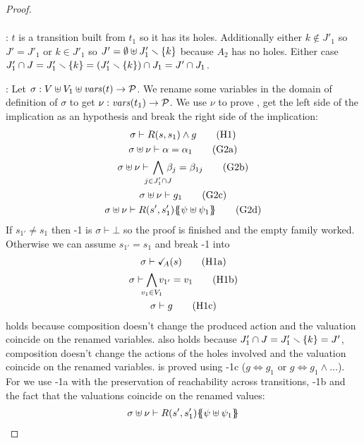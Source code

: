 \documentclass{article}
\begin{document}
\begin{proof}
\begin{gather}
	\end{gather}
\item[\goal{0'}:] \(t\) is a transition built from \(t_1\) so it has its holes.
	Additionally either \(k \notin J'_1\) so \(J' = J'_1\) or \(k \in J'_1\) so \(J' = \emptyset \uplus J'_1 \smallsetminus {\left\{k\right\}}\) because \(A_2\) has no holes.
	Either case \(J'_1 \cap J = J'_1 \smallsetminus {\left\{k\right\}} = {\left(J'_1 \smallsetminus {\left\{k\right\}}\right)} \cap J_1 = J' \cap J_1\).
\item[\goal{2}:] Let \(\sigma: V \uplus V_1 \uplus \mathit{vars}{\left(t\right)} \to \mathcal{P}\).
	We rename some variables in the domain of definition of \(\sigma\) to get \(\nu: \mathit{vars}{\left(t_1\right)} \to \mathcal{P}\).
	We use \(\nu\) to prove , get the left side of the implication as an hypothesis and break the right side of the implication:
	\begin{gather}
		\sigma \vdash R\mpar{s, s_1} \wedge g \hyp{1} \\
		\sigma \uplus \nu \vdash \alpha = \alpha_1 \goal{2a} \\
		\sigma \uplus \nu \vdash \bigwedge_\subbox{j \in J'_1 \cap J} \beta_j = \beta_{1j} \goal{2b} \\
		\sigma \uplus \nu \vdash g_1 \goal{2c} \\
		\sigma \uplus \nu \vdash R\mpar{s', s'_1}\psubst{\psi \uplus \psi_1} \goal{2d}
	\end{gather}
	If \(s_{1'} \neq s_1\) then \hyp{1} is \(\sigma \vdash \bot\) so the proof is finished and the empty family worked.
	Otherwise we can assume \(s_{1'} = s_1\) and break \hyp{1} into
	\begin{gather}
		\sigma \vdash \reach{A}\mpar{s} \hyp{1a} \\
		\sigma \vdash \bigwedge_\subbox{v_1 \in V_1} v_{1'} = v_1 \hyp{1b} \\
		\sigma \vdash g \hyp{1c}
	\end{gather}
	 holds because composition doesn't change the produced action and the valuation coincide on the renamed variables.
	 also holds because \(J'_1 \cap J = J'_1 \smallsetminus {\left\{k\right\}} = J'\), composition doesn't change the actions of the holes involved and the valuation coincide on the renamed variables.
	 is proved using \hyp{1c} (\(g \iff g_1\) or \(g \iff g_1 \wedge \dots\)).
	For  we use \hyp{1a} with the preservation of reachability across transitions, \hyp{1b} and the fact that the valuations coincide on the renamed values:
	\begin{align*}
		& \sigma \uplus \nu \vdash R\mpar{s', s'_1}\psubst{\psi \uplus \psi_1} \\

\end{align*}
\end{proof}
\end{document}
